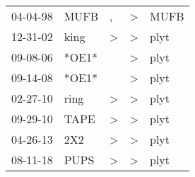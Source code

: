 \begin{supertabular}{p{0.07\textwidth}p{0.06\textwidth}p{0.02\textwidth}p{0.02\textwidth}p{0.06\textwidth}}
 04-04-98\textsuperscript{} &  MUFB\textsuperscript{} &             , &  \textgreater &  MUFB\textsuperscript{} \\
 12-31-02\textsuperscript{} &  king\textsuperscript{} &  \textgreater &  \textgreater &  plyt\textsuperscript{} \\
 09-08-06\textsuperscript{} &                   *OE1* &               &  \textgreater &  plyt\textsuperscript{} \\
 09-14-08\textsuperscript{} &                   *OE1* &               &  \textgreater &  plyt\textsuperscript{} \\
 02-27-10\textsuperscript{} &  ring\textsuperscript{} &  \textgreater &  \textgreater &  plyt\textsuperscript{} \\
 09-29-10\textsuperscript{} &  TAPE\textsuperscript{} &  \textgreater &  \textgreater &  plyt\textsuperscript{} \\
 04-26-13\textsuperscript{} &   2X2\textsuperscript{} &  \textgreater &  \textgreater &  plyt\textsuperscript{} \\
 08-11-18\textsuperscript{} &  PUPS\textsuperscript{} &  \textgreater &  \textgreater &  plyt\textsuperscript{} \\
\end{supertabular}

